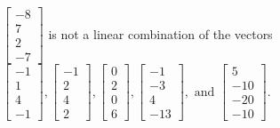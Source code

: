 \begin{exercise}
\begin{exerciseStatement}
  \end{exerciseStatement}
  \begin{exerciseAnswer}
   \(\left[\begin{array}{c}
-8 \\
7 \\
2 \\
-7
\end{array}\right]\) 
  	 is not  
	a linear combination of the vectors \(\left[\begin{array}{c}
-1 \\
1 \\
4 \\
-1
\end{array}\right] , \left[\begin{array}{c}
-1 \\
2 \\
4 \\
2
\end{array}\right] , \left[\begin{array}{c}
0 \\
2 \\
0 \\
6
\end{array}\right] , \left[\begin{array}{c}
-1 \\
-3 \\
4 \\
-13
\end{array}\right] , \text{ and } \left[\begin{array}{c}
5 \\
-10 \\
-20 \\
-10
\end{array}\right]\).

	
  


  \end{exerciseAnswer}
\end{exercise}